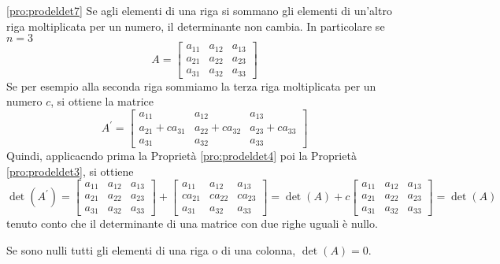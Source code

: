 \begin{pro}
  \ref{pro:prodeldet7}
  Se agli elementi di una riga si sommano gli elementi di un'altro riga
  moltiplicata per un numero, il determinante non cambia. In particolare
  se $n=3$
  \begin{equation*}
    A=
    \begin{bmatrix}
      a_{11} & a_{12} & a_{13}\\
      a_{21} & a_{22} & a_{23}\\
      a_{31} & a_{32} & a_{33}
    \end{bmatrix}
  \end{equation*}
  Se per esempio alla seconda riga sommiamo la terza riga moltiplicata per
  un numero $c$, si ottiene la matrice
  \begin{equation*}
    A^\prime =
    \begin{bmatrix}
      a_{11} & a_{12} & a_{13}\\
      a_{21}+ca_{31} & a_{22}+ca_{32} & a_{23}+ca_{33}\\
      a_{31} & a_{32} & a_{33}
    \end{bmatrix}
  \end{equation*}
  Quindi, applicacndo prima la Proprietà \ref{pro:prodeldet4} poi la
  Proprietà \ref{pro:prodeldet3}, si ottiene
  \begin{equation*}
    \det(A^\prime)=
    \begin{bmatrix}
      a_{11} & a_{12} & a_{13}\\
      a_{21} & a_{22} & a_{23}\\
      a_{31} & a_{32} & a_{33}
    \end{bmatrix} +
    \begin{bmatrix}
      a_{11} & a_{12} & a_{13}\\
      ca_{21} & ca_{22} & ca_{23}\\
      a_{31} & a_{32} & a_{33}
    \end{bmatrix}=\det(A)+c\begin{bmatrix}
      a_{11} & a_{12} & a_{13}\\
      a_{21} & a_{22} & a_{23}\\
      a_{31} & a_{32} & a_{33}
    \end{bmatrix}=\det(A)
  \end{equation*}
  tenuto conto che il determinante di una matrice con due righe uguali è
  nullo.
\end{pro}
\begin{pro}
  \label{pro:prodeldet8}
  Se sono nulli tutti gli elementi di una riga o di una colonna,
  $\det(A)=0$.
\end{pro}
